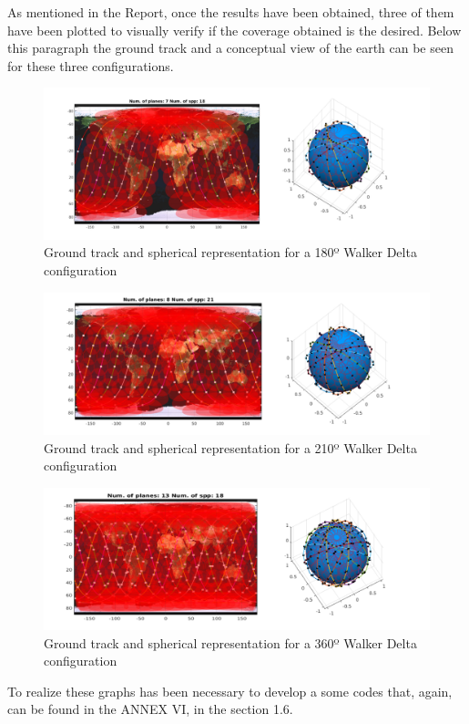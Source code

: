 As mentioned in the Report, once the results have been obtained, three of them have been plotted to visually verify if the coverage obtained is the desired. Below this paragraph the ground track and a conceptual view of the earth can be seen for these three configurations.

\begin{figure}[H] %
	\centering
	\includegraphics[width=1\textwidth]{./testing/WB180.png}
	\caption{Ground track and spherical representation for a 180º Walker Delta configuration}
	\label{fig:graph120}
\end{figure}

\begin{figure}[H] %
	\centering
	\includegraphics[width=1\textwidth]{./testing/WB210.png}
	\caption{Ground track and spherical representation for a 210º Walker Delta configuration}
	\label{fig:graph120}
\end{figure}

\begin{figure}[H] %
	\centering
	\includegraphics[width=1\textwidth]{./testing/WB360.png}
	\caption{Ground track and spherical representation for a 360º Walker Delta configuration}
	\label{fig:graph120}
\end{figure}

To realize these graphs has been necessary to develop a some codes that, again, can be found in the ANNEX VI, in the section 1.6.